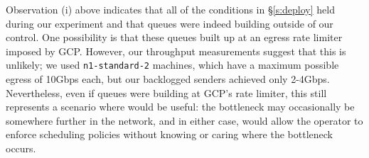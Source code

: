 Observation (i) above indicates that all of the conditions in \S\ref{s:deploy} held during our experiment and that queues were indeed building outside of our control. One possibility is that these queues built up at an egress rate limiter imposed by GCP. However, our throughput measurements suggest that this is unlikely; we used \texttt{n1-standard-2} machines, which have a maximum possible egress of 10Gbps each, but our backlogged senders achieved only 2-4Gbps. Nevertheless, even if queues were building at GCP's rate limiter, this still represents a scenario where \name would be useful: the bottleneck may occasionally be somewhere further in the network, and in either case, \name would allow the operator to enforce scheduling policies without knowing or caring where the bottleneck occurs.

